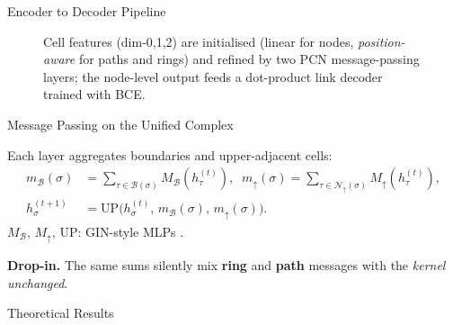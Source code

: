 \documentclass[final]{beamer}
\newlength{\colwidth}
\begin{document}
\begin{frame}[t]
\begin{columns}[t]
\begin{column}{\colwidth}
\begin{block}{Encoder to Decoder Pipeline}
\begin{figure}
          \caption{Cell features (dim-0,1,2) are initialised (linear
            for nodes, \emph{position-aware} for paths and rings) and
            refined by two PCN message-passing layers; the node-level
          output feeds a dot-product link decoder trained with BCE.}
        \end{figure}

      \end{block}

      \medskip

      \begin{block}{Message Passing on the Unified Complex}

        Each layer aggregates boundaries and upper-adjacent cells:
        {\small
          \begin{align*}
            m_\mathcal B(\sigma) &= \sum_{\tau\in\mathcal B(\sigma)} M_\mathcal B(h_\tau^{(t)}),\;\;
            m_\uparrow(\sigma) = \sum_{\tau\in\mathcal N_\uparrow(\sigma)} M_\uparrow(h_\tau^{(t)}), \\[2pt]
            h_\sigma^{(t+1)} &= \mathrm{UP}\bigl(h_\sigma^{(t)},\,m_\mathcal B(\sigma),\,m_\uparrow(\sigma)\bigr).
          \end{align*}
        }%
        $M_\mathcal B,\,M_\uparrow,\,\mathrm{UP}$: GIN-style MLPs \citep{xu_how_2019}.

        \medskip
        \textbf{Drop-in.} The same sums silently mix
        \textcolor{orange!75!black}{\textbf{ring}} and \textcolor{blue!70!black}{\textbf{path}}
        messages with the \emph{kernel unchanged}.

      \end{block}

      \medskip

      \begin{exampleblock}{Theoretical Results}


\end{exampleblock}
\end{column}
\end{columns}
\end{frame}
\end{document}

